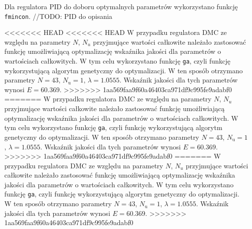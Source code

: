 Dla regulatora PID do doboru optymalnych parametrów wykorzystano funkcję 
\verb+fmincon+. //TODO: PID do opisania

<<<<<<< HEAD
<<<<<<< HEAD
W przypadku regulatora DMC ze względu na parametry $N$, $N_u$ przyjmujące wartości całkowite należało zastosować funkcję umożliwiającą optymalizację wskaźnika jakości dla parametrów o wartościach całkowitych. W tym celu wykorzystano funkcję \verb+ga+, czyli funkcję wykorzystującą algorytm genetyczny do optymalizacji. W ten sposób otrzymano parametry $N=43$, $N_\mathrm{u}=1$, $\lambda=\num{1.0555}$. Wskaźnik jakości dla tych parametrów wynosi $E=\num{60.369}$.
>>>>>>> 1aa569faa9f60a46403ca971df9c995fe9adabf0
=======
W przypadku regulatora DMC ze względu na parametry $N$, $N_u$ przyjmujące wartości całkowite należało zastosować funkcję umożliwiającą optymalizację wskaźnika jakości dla parametrów o wartościach całkowitych. W tym celu wykorzystano funkcję \verb+ga+, czyli funkcję wykorzystującą algorytm genetyczny do optymalizacji. W ten sposób otrzymano parametry $N=43$, $N_\mathrm{u}=1$, $\lambda=\num{1.0555}$. Wskaźnik jakości dla tych parametrów wynosi $E=\num{60.369}$.
>>>>>>> 1aa569faa9f60a46403ca971df9c995fe9adabf0
=======
W przypadku regulatora DMC ze względu na parametry $N$, $N_u$ przyjmujące wartości całkowite należało zastosować funkcję umożliwiającą optymalizację wskaźnika jakości dla parametrów o wartościach całkowitych. W tym celu wykorzystano funkcję \verb+ga+, czyli funkcję wykorzystującą algorytm genetyczny do optymalizacji. W ten sposób otrzymano parametry $N=43$, $N_\mathrm{u}=1$, $\lambda=\num{1.0555}$. Wskaźnik jakości dla tych parametrów wynosi $E=\num{60.369}$.
>>>>>>> 1aa569faa9f60a46403ca971df9c995fe9adabf0
